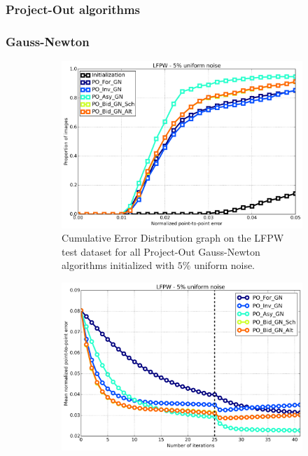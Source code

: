 \subsubsection{Project-Out algorithms}


\subsubsection*{Gauss-Newton}

\begin{figure}[h!]
	\centering
	\begin{subfigure}{0.48\textwidth}
	    \includegraphics[width=\textwidth]{experiments/algorithms/po_gn/ced_po_gn_5.png}
	    \caption{Cumulative Error Distribution graph on the LFPW test dataset for all Project-Out Gauss-Newton algorithms initialized with $5\%$ uniform noise.}
	    \label{fig:ced_po_gn_5}
	\end{subfigure}
	\hfill
	\begin{subfigure}{0.48\textwidth}
	    \includegraphics[width=\textwidth]{experiments/algorithms/po_gn/mean_error_vs_iters_po_gn_5.png}

\end{subfigure}
\end{figure}
